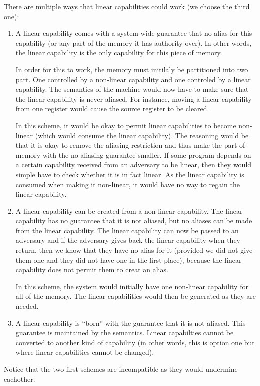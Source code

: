 \documentclass[a4paper]{article}
\begin{document}
There are multiple ways that linear capabilities could work (we choose the third one):
\begin{enumerate}
\item A linear capability comes with a system wide guarantee that no alias for this capability (or any part of the memory it has authority over). In other words, the linear capability is the only capability for this piece of memory. 

In order for this to work, the memory must initilaly be partitioned into two part. One controlled by a non-linear capability and one controled by a linear capability. The semantics of the machine would now have to make sure that the linear capability is never aliased. For instance, moving a linear capability from one register would cause the source register to be cleared. 

In this scheme, it would be okay to permit linear capabilities to become non-linear (which would consume the linear capability). The reasoning would be that it is okay to remove the aliasing restriction and thus make the part of memory with the no-aliasing guarantee smaller. If some program depends on a certain capability received from an adversary to be linear, then they would simple have to check whether it is in fact linear. As the linear capability is consumed when making it non-linear, it would have no way to regain the linear capability.

\item A linear capability can be created from a non-linear capability. The linear capability has no guarantee that it is not aliased, but no aliases can be made from the linear capability. The linear capability can now be passed to an adversary and if the adversary gives back the linear capability when they return, then we know that they have no alias for it (provided we did not give them one and they did not have one in the first place), because the linear capability does not permit them to creat an alias.

In this scheme, the system would initially have one non-linear capability for all of the memory. The linear capabilities would then be generated as they are needed.
\item A linear capability is ``born'' with the guarantee that it is not aliased. This guarantee is maintained by the semantics. Linear capabilties cannot be converted to another kind of capability (in other words, this is option one but where linear capabilities cannot be changed).
\end{enumerate}
Notice that the two first schemes are incompatible as they would undermine eachother.
\end{document}
